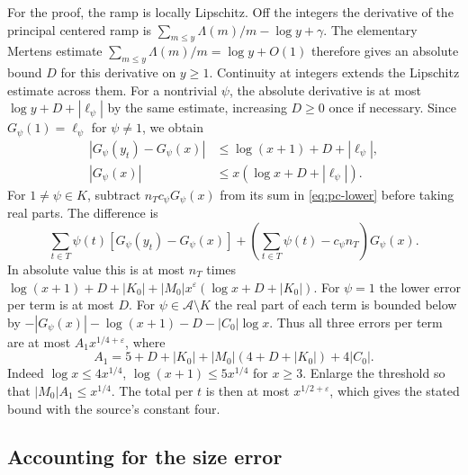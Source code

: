 For the proof, the ramp is locally Lipschitz. Off the integers the
derivative of the principal centered ramp is
\(\sum_{m\leq y}\Lambda(m)/m-\log y+\gamma\).
The elementary Mertens estimate
\(\sum_{m\leq y}\Lambda(m)/m=\log y+O(1)\) therefore gives an absolute
bound \(D\) for this derivative on \(y\geq1\). Continuity at integers
extends the Lipschitz estimate across them. For a nontrivial \(\psi\),
the absolute derivative is at most \(\log y+D+|\ell_\psi|\) by the
same estimate, increasing \(D\geq0\) once if necessary. Since
\(G_\psi(1)=\ell_\psi\) for \(\psi\ne1\), we obtain
\begin{align*}
 |G_\psi(y_t)-G_\psi(x)|&\leq\log(x+1)+D+|\ell_\psi|,\\
 |G_\psi(x)|&\leq x(\log x+D+|\ell_\psi|).
\end{align*}
For \(1\ne\psi\in K\), subtract \(n_Tc_\psi G_\psi(x)\) from its
sum in \eqref{eq:pc-lower} before taking real parts. The difference is
\[
  \sum_{t\in T}\psi(t)[G_\psi(y_t)-G_\psi(x)]
          +\left(\sum_{t\in T}\psi(t)-c_\psi n_T\right)G_\psi(x).
\]
In absolute value this is at most \(n_T\) times
\(\log(x+1)+D+|K_0|+|M_0|x^\varepsilon(\log x+D+|K_0|)\).
For \(\psi=1\) the lower error per term is at most \(D\).
For \(\psi\in\mathcal A\setminus K\) the real part of each term is
bounded below by \(-|G_\psi(x)|-\log(x+1)-D-|C_0|\log x\).
Thus all three errors per term are at most \(A_1x^{1/4+\varepsilon}\), where
\[
 A_1=5+D+|K_0|+|M_0|(4+D+|K_0|)+4|C_0|.
\]
Indeed \(\log x\leq4x^{1/4}\), \(\log(x+1)\leq5x^{1/4}\) for \(x\geq3\).
Enlarge the threshold so that \(|M_0|A_1\leq x^{1/4}\). The total
per \(t\) is then at most \(x^{1/2+\varepsilon}\), which gives the
stated bound with the source's constant four.

\subsection{Accounting for the size error}

